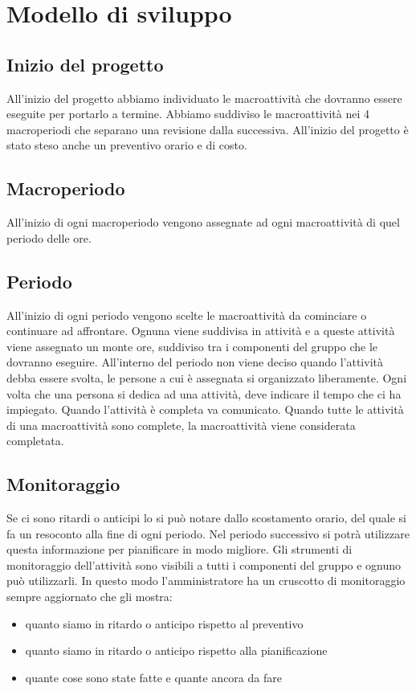 \section{Modello di sviluppo}


\subsection{Inizio del progetto}
All'inizio del progetto abbiamo individuato le macroattività che dovranno essere eseguite per portarlo a termine.
Abbiamo suddiviso le macroattività nei 4 macroperiodi che separano una revisione dalla successiva.
All'inizio del progetto è stato steso anche un preventivo orario e di costo.
\subsection{Macroperiodo}
All'inizio di ogni macroperiodo vengono assegnate ad ogni macroattività di quel periodo delle ore.
\subsection{Periodo}
All'inizio di ogni periodo vengono scelte le macroattività da cominciare o continuare ad affrontare.
Ognuna viene suddivisa in attività e a queste attività viene assegnato un monte ore, suddiviso tra i componenti del gruppo che le dovranno eseguire.
All'interno del periodo non viene deciso quando l'attività debba essere svolta, le persone a cui è assegnata si organizzato liberamente.
Ogni volta che una persona si dedica ad una attività, deve indicare il tempo che ci ha impiegato.
Quando l'attività è completa va comunicato.
Quando tutte le attività di una macroattività sono complete, la macroattività viene considerata completata.

\subsection{Monitoraggio}
Se ci sono ritardi o anticipi lo si può notare dallo scostamento orario, del quale si fa un resoconto alla fine di ogni periodo. Nel periodo successivo si potrà utilizzare questa informazione per pianificare in modo migliore.
Gli strumenti di monitoraggio dell'attività sono visibili a tutti i componenti del gruppo e ognuno può utilizzarli. In questo modo l'amministratore ha un cruscotto di monitoraggio sempre aggiornato che gli mostra:
\begin{itemize}
	\item quanto siamo in ritardo o anticipo rispetto al preventivo
	\item quanto siamo in ritardo o anticipo rispetto alla pianificazione
	\item quante cose sono state fatte e quante ancora da fare
\end{itemize}



